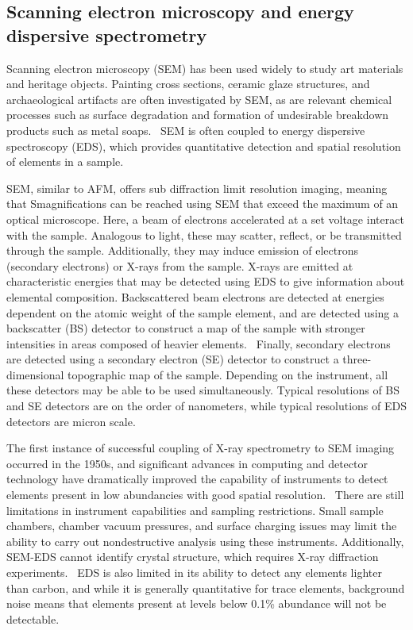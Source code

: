 \subsection[Scanning electron microscopy and energy dispersive spectrometry]{Scanning electron microscopy and energy dispersive spectrometry}
\label{subsection1.2.2}

Scanning electron microscopy (SEM) has been used widely to study art materials and heritage objects. Painting cross sections, ceramic glaze structures, and archaeological artifacts are often investigated by SEM, as are relevant chemical processes such as surface degradation and formation of undesirable breakdown products such as metal soaps.~\autocite{Lazzara, Hermans, Pradell, Schreiner} SEM is often coupled to energy dispersive spectroscopy (EDS), which provides quantitative detection and spatial resolution of elements in a sample.

SEM, similar to AFM, offers sub diffraction limit resolution imaging, meaning that Smagnifications can be reached using SEM that exceed the maximum of an optical microscope. Here, a beam of electrons accelerated at a set voltage interact with the sample. Analogous to light, these may scatter, reflect, or be transmitted through the sample. Additionally, they may induce emission of electrons (secondary electrons) or X-rays from the sample. X-rays are emitted at characteristic energies that may be detected using EDS to give information about elemental composition. Backscattered beam electrons are detected at energies dependent on the atomic weight of the sample element, and are detected using a backscatter (BS) detector to construct a map of the sample with stronger intensities in areas composed of heavier elements.~\autocite{Lazzara,Pradell,Schreiner} Finally, secondary electrons are detected using a secondary electron (SE) detector to construct a three-dimensional topographic map of the sample. Depending on the instrument, all these detectors may be able to be used simultaneously. Typical resolutions of BS and SE detectors are on the order of nanometers, while typical resolutions of EDS detectors are micron scale.~\autocite{Lazzara}

The first instance of successful coupling of X-ray spectrometry to SEM imaging occurred in the 1950s, and significant advances in computing and detector technology have dramatically improved the capability of instruments to detect elements present in low abundancies with good spatial resolution.~\autocite{Schreiner} There are still limitations in instrument capabilities and sampling restrictions. Small sample chambers, chamber vacuum pressures, and surface charging issues may limit the ability to carry out nondestructive analysis using these instruments. Additionally, SEM-EDS cannot identify crystal structure, which requires X-ray diffraction experiments.~\autocite{Lazzara,Schreiner} EDS is also limited in its ability to detect any elements lighter than carbon, and while it is generally quantitative for trace elements, background noise means that elements present at levels below 0.1\% abundance will not be detectable.~\autocite{Schreiner,Pradell,Lazzara}


